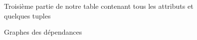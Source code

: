 \documentclass[a4paper,sffamily,12pt]{article}
\begin{document}
				\begin{figure}[!h]
					\centering						
					\caption{Troisième partie de notre table contenant tous les attributs et quelques tuples}
					\label{table_p3}	
				\end{figure}	

				\begin{figure}[!h]
					\centering						
					\caption{Graphes des dépendances}
					\label{graphe_dependances}	
				\end{figure}	
					
\end{document}

